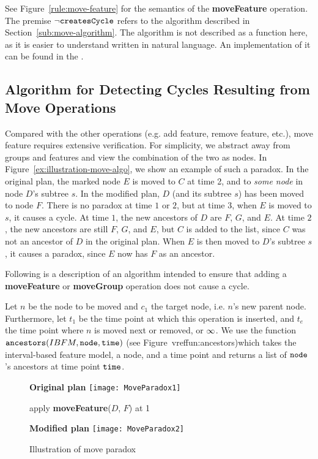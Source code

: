 See Figure~\vref{rule:move-feature} for the semantics of the \textbf{moveFeature} operation. The premise $\neg \texttt{createsCycle}$ refers to the algorithm described in Section~\vref{sub:move-algorithm}. The algorithm is not described as a function here, as it is easier to understand written in natural language. An implementation of it can be found in the . 

\subsection{Algorithm for Detecting Cycles Resulting from \textbf{Move} Operations}
\label{sub:move-algorithm}

Compared with the other operations (e.g. add feature, remove feature, etc.), move feature requires extensive verification. For simplicity, we abstract away from groups and features and view the combination of the two as nodes. In Figure~\vref{ex:illustration-move-algo}, we show an example of such a paradox. In the original plan, the marked node $E$ is moved to $C$ at time 2, and to \emph{some node} in node $D$'s subtree $s$. In the modified plan, $D$ (and its subtree $s$) has been moved to node $F$. There is no paradox at time $1$ or $2$, but at time 3, when $E$ is moved to $s$, it causes a cycle. At time $1$, the new ancestors of $D$ are $F$, $G$, and $E$. At time $2$, the new ancestors are still $F$, $G$, and $E$, but $C$ is added to the list, since $C$ was not an ancestor of $D$ in the original plan. When $E$ is then moved to $D$'s subtree $s$, it causes a paradox, since $E$ now has $F$ as an ancestor.

Following is a description of an algorithm intended to ensure that adding a \textbf{moveFeature} or \textbf{moveGroup} operation does not cause a cycle.

Let $n$ be the node to be moved and $c_1$ the target node, i.e. $n$'s new parent node. Furthermore, let $t_1$ be the time point at which this operation is inserted, and $t_e$ the time point where $n$ is moved next or removed, or $\infty$. We use the function $\texttt{ancestors}(IBFM, \texttt{node}, \texttt{time})$ (see Figure~vref{fun:ancestors})which takes the interval-based feature model, a node, and a time point and returns a list of $\texttt{node}$'s ancestors at time point $\texttt{time}$. 


\begin{figure}
  \centering
  \textbf{Original plan}
  \texttt{[image: MoveParadox1]}
  \bigskip

  apply \textbf{moveFeature}($D$, $F$) at 1
  \bigskip 
  
  \textbf{Modified plan}
  \texttt{[image: MoveParadox2]}
  \caption{Illustration of move paradox}
  \label{ex:illustration-move-algo}
\end{figure}


